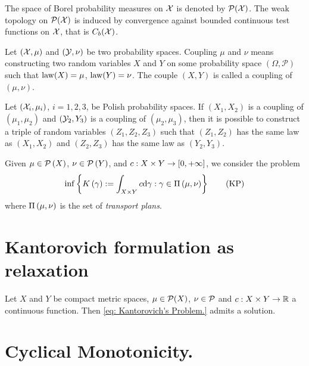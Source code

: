 \begin{definition}
The space of Borel probability measures on $\mathcal{X}$ is denoted by $\mathcal{P}(\mathcal{X})$. The weak topology on $\mathcal{P}(\mathcal{X})$ is induced by convergence against bounded continuous test functions on $\mathcal{X}$, that is $C_b(\mathcal{X})$.
\end{definition}

\begin{definition}[Coupling] Let $(\mathcal{X}, \mu)$ and $(\mathcal{Y}, \nu)$ be two probability spaces. Coupling $\mu$ and $\nu$ means constructing two random variables $X$ and $Y$ on some probability space $(\Omega, \mathcal{P})$ such that $\mathrm{law}(X)=\mu$, $\mathrm{law}(Y)=\nu$. The couple $(X,Y)$ is called a coupling of $(\mu, \nu)$.  
\end{definition}

\begin{theorem} Let $(\mathcal{X}_i , \mu_i)$, $i = 1, 2, 3$,  be Polish probability spaces. If
	$(X_1 , X_2)$ is a coupling of $(\mu_1, \mu_2 )$ and $(\mathcal{Y}_2 , Y_3)$ is a coupling of $(\mu_2, \mu_3)$, then it is possible to construct a triple of random variables $(Z_1 , Z_2, Z_3)$ such
	that $(Z_1, Z_2)$ has the same law as $(X_1 , X_2)$ and $(Z_2, Z_3)$ has the same
	law as $(Y_2 , Y_3)$.
\end{theorem}
\begin{problem}Given $\mu \in \mathcal{P}\left( X \right)$, $\nu \in \mathcal{P}\left( Y \right)$, and $c: X\times Y \rightarrow \left[ 0, +\infty \right]$, we consider the problem
	\begin{equation}
		\inf\left\lbrace K\left(\gamma\right) := \int_{X\times Y} c \mathrm{d}\gamma : \gamma \in \Pi\left(\mu, \nu\right) \right\rbrace\label{eq: Kantorovich's Problem.}\tag{KP}
	\end{equation}
where $\Pi\left(\mu, \nu\right)$ is the set of \textit{transport plans}.
\end{problem}
\section{Kantorovich formulation as relaxation}

\begin{theorem}
	Let $X$ and $Y$ be compact metric spaces, $\mu \in \mathcal{P}(X)$, $\nu \in  \mathcal{P}$ and
	$c:X\times Y \rightarrow \mathbb{R}$  a continuous function. Then  \eqref{eq: Kantorovich's Problem.} admits a solution.
\end{theorem} 

\section{Cyclical Monotonicity.}

